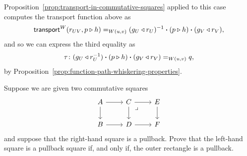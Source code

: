 \begin{solution}
    Proposition~\ref{prop:transport-in-commutative-squares} applied to this case computes the transport function above as
    \[
        \mathsf{transport}^W(r_{UV},p\triangleright h)\mathrel{=_{W(u,v)}}
            (g_U\triangleleft r_U)^{-1}\mathbin{\boldsymbol{\cdot}}(p\triangleright h)\mathbin{\boldsymbol{\cdot}}(g_V\triangleleft r_V),
    \]
    and so we can express the third equality as
    \[
        \tau\colon(g_U\lwct r_U^{-1})\ct(p\rwct h)\ct(g_V\lwct r_V)
        \eq{W(u,v)}q,
    \]
    by Proposition~\ref{prop:function-path-whiskering-properties}.
    
\end{solution}

\begin{exr}
    Suppose we are given two commutative squares
    \[
        \begin{tikzcd}
            A
                    \arrow[r]
                    \arrow[d]
                &C
                    \arrow[r]
                    \arrow[d]
                    \arrow[dr,
                        phantom,
                        "\lrcorner",
                        very near start]
                &E
                    \arrow[d]\\
            B
                    \arrow[r]
                &D
                    \arrow[r]
                &F
        \end{tikzcd}
    \]
    and suppose that the right-hand square is a pullback. Prove that the left-hand square is a pullback square if, and only if, the outer rectangle is a pullback.
\end{exr}

